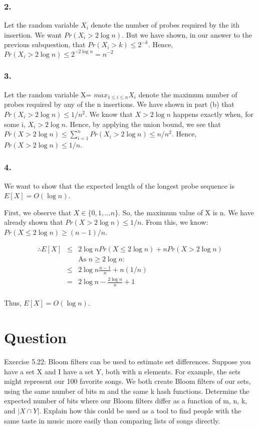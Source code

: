 \documentclass[10pt]{article}
\begin{document}
\subsubsection{2.} 
Let the random variable $X_{i}$ denote the number of probes required by the ith insertion. We want $Pr(X_{i}>2\log n)$. But we have shown, in our answer to the previous subquestion, that $Pr(X_{i}>k) \leq 2^{-k}$. Hence, $Pr(X_{i}>2 \log n) \leq 2^{-2 \log n}=n^{-2}$


\subsubsection{3.} 
Let the random variable X= $max_{1\leq i \leq n} X_{i}$ denote the maximum number of probes required by any of the n insertions. We have shown in part (b) that $Pr(X_{i}>2 \log n)\leq 1/n^{2}$. We know that $X>2 \log n$ happens exactly when, for some i, $X_{i} > 2 \log n$. Hence, by applying the union bound, we see that $Pr(X>2 \log n) \leq \sum_{i=1}^{n} Pr(X_{i}>2 \log n) \leq n/n^{2}$. Hence, $Pr(X>2 \log n)\leq 1/n$.

\subsubsection{4.} We want to show that the expected length of the longest probe sequence is $E[X]=O(\log n)$.

First, we observe that $X \in \{0,1,...n\}$. So, the maximum value of X is n. We have already shown that $Pr(X>2 \log n)\leq 1/n$. From this, we know: $Pr(X \leq 2 \log n)\geq (n-1)/n$.

\begin{eqnarray}
\therefore E[X] &\leq& 2 \log n Pr(X \leq 2 \log n) + n Pr(X>2 \log n)\\
&&\text{As $n \geq 2\log n$:}\\
&\leq& 2 \log n \frac{n-1}{n} + n (1/n)\\
&=& 2 \log n -\frac{2 \log n}{n} + 1\\
\end{eqnarray} 

Thus, $E[X]=O(\log n)$.

\section{Question}
Exercise 5.22: Bloom filters can be used to estimate set differences. Suppose you have a set X and I have a set Y, both with n elements. For example, the sets might represent our 100 favorite songs. We both create Bloom filters of our sets, using the same number of bits m and the same k hash functions. Determine the expected number of bits where our Bloom filters differ as a function of m, n, k, and $|X \cap Y|$. Explain how this could be used as a tool to find people with the same taste in music more easily than comparing lists of songs directly.
\end{document}
